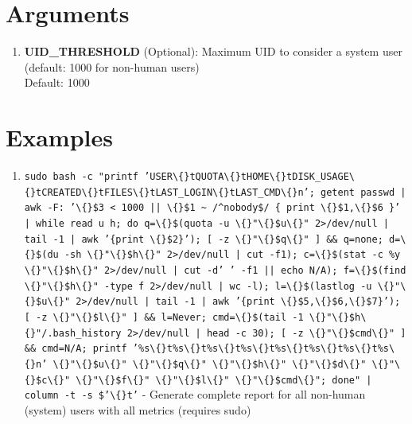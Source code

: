 \documentclass[openany]{book}
\begin{document}
\section*{Arguments}
\begin{enumerate}
  \item \textbf{UID\_THRESHOLD} (Optional): Maximum UID to consider a system user (default: 1000 for non-human users) \\ Default: 1000
\end{enumerate}

\section*{Examples}
\begin{enumerate}
  \item \texttt{sudo bash -c "printf 'USER\textbackslash\{\}tQUOTA\textbackslash\{\}tHOME\textbackslash\{\}tDISK\_USAGE\textbackslash\{\}tCREATED\textbackslash\{\}tFILES\textbackslash\{\}tLAST\_LOGIN\textbackslash\{\}tLAST\_CMD\textbackslash\{\}n'; getent passwd | awk -F: '\textbackslash\{\}\$3 < 1000 || \textbackslash\{\}\$1 \textasciitilde{} /\textasciicircum{}nobody\$/ \{ print \textbackslash\{\}\$1,\textbackslash\{\}\$6 \}' | while read u h; do q=\textbackslash\{\}\$(quota -u \textbackslash\{\}"\textbackslash\{\}\$u\textbackslash\{\}" 2>/dev/null | tail -1 | awk '\{print \textbackslash\{\}\$2\}'); [ -z \textbackslash\{\}"\textbackslash\{\}\$q\textbackslash\{\}" ] \&\& q=none; d=\textbackslash\{\}\$(du -sh \textbackslash\{\}"\textbackslash\{\}\$h\textbackslash\{\}" 2>/dev/null | cut -f1); c=\textbackslash\{\}\$(stat -c \%y \textbackslash\{\}"\textbackslash\{\}\$h\textbackslash\{\}" 2>/dev/null | cut -d' ' -f1 || echo N/A); f=\textbackslash\{\}\$(find \textbackslash\{\}"\textbackslash\{\}\$h\textbackslash\{\}" -type f 2>/dev/null | wc -l); l=\textbackslash\{\}\$(lastlog -u \textbackslash\{\}"\textbackslash\{\}\$u\textbackslash\{\}" 2>/dev/null | tail -1 | awk '\{print \textbackslash\{\}\$5,\textbackslash\{\}\$6,\textbackslash\{\}\$7\}'); [ -z \textbackslash\{\}"\textbackslash\{\}\$l\textbackslash\{\}" ] \&\& l=Never; cmd=\textbackslash\{\}\$(tail -1 \textbackslash\{\}"\textbackslash\{\}\$h\textbackslash\{\}"/.bash\_history 2>/dev/null | head -c 30); [ -z \textbackslash\{\}"\textbackslash\{\}\$cmd\textbackslash\{\}" ] \&\& cmd=N/A; printf '\%s\textbackslash\{\}t\%s\textbackslash\{\}t\%s\textbackslash\{\}t\%s\textbackslash\{\}t\%s\textbackslash\{\}t\%s\textbackslash\{\}t\%s\textbackslash\{\}t\%s\textbackslash\{\}n' \textbackslash\{\}"\textbackslash\{\}\$u\textbackslash\{\}" \textbackslash\{\}"\textbackslash\{\}\$q\textbackslash\{\}" \textbackslash\{\}"\textbackslash\{\}\$h\textbackslash\{\}" \textbackslash\{\}"\textbackslash\{\}\$d\textbackslash\{\}" \textbackslash\{\}"\textbackslash\{\}\$c\textbackslash\{\}" \textbackslash\{\}"\textbackslash\{\}\$f\textbackslash\{\}" \textbackslash\{\}"\textbackslash\{\}\$l\textbackslash\{\}" \textbackslash\{\}"\textbackslash\{\}\$cmd\textbackslash\{\}"; done" | column -t -s \$'\textbackslash\{\}t'} - Generate complete report for all non-human (system) users with all metrics (requires sudo)

\end{enumerate}
\end{document}
